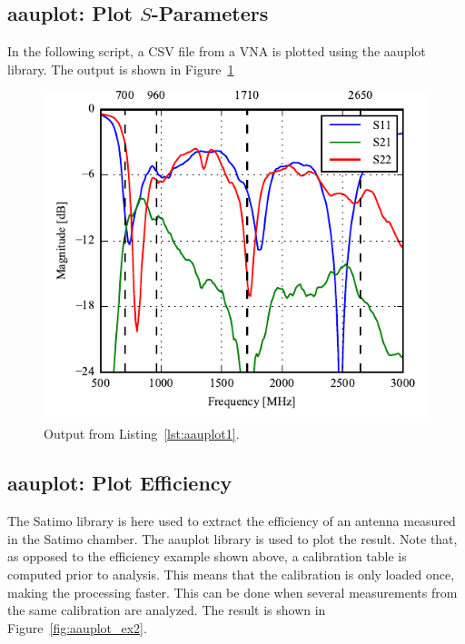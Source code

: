 \subsection{aauplot: Plot $S$-Parameters}
In the following script, a CSV file from a VNA is plotted using the aauplot library. The output is shown in Figure~\ref{fig:aauplot_ex1}



\begin{figure}[htbp]
    \centering
    \includegraphics{sec/post_processing/examples_aauplot/ex1_sparams.pdf}
    \caption{Output from Listing~\ref{lst:aauplot1}.}
    \label{fig:aauplot_ex1}
\end{figure}

\subsection{aauplot: Plot Efficiency}
The Satimo library is here used to extract the efficiency of an antenna measured in the Satimo chamber. The aauplot library is used to plot the result. Note that, as opposed to the efficiency example shown above, a calibration table is computed prior to analysis. This means that the calibration is only loaded once, making the processing faster. This can be done when several measurements from the same calibration are analyzed. The result is shown in Figure~\ref{fig:aauplot_ex2}.

